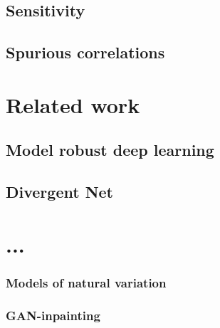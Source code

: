 \subsection{Sensitivity}
\subsection{Spurious correlations}
\section{Related work}
	\subsection{Model robust deep learning}    
	\subsection{Divergent Net}
\section{...}
   \subsubsection{Models of natural variation}
   \subsubsection{GAN-inpainting}